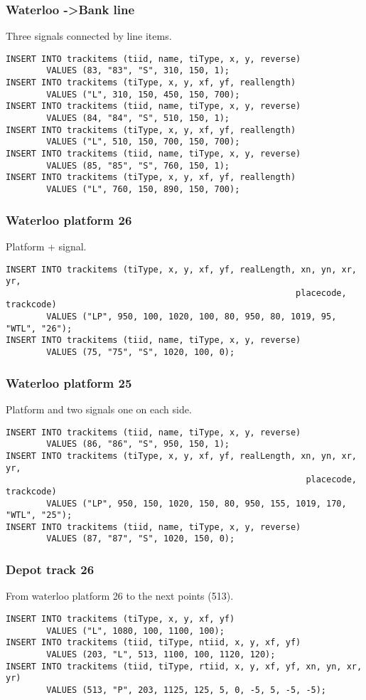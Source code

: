 \documentclass[12pt,a4paper]{article}
\begin{document}
\subsubsection{Waterloo -\textgreater Bank line}
Three signals connected by line items.
\begin{verbatim}
INSERT INTO trackitems (tiid, name, tiType, x, y, reverse)
        VALUES (83, "83", "S", 310, 150, 1);
INSERT INTO trackitems (tiType, x, y, xf, yf, reallength)
        VALUES ("L", 310, 150, 450, 150, 700);
INSERT INTO trackitems (tiid, name, tiType, x, y, reverse)
        VALUES (84, "84", "S", 510, 150, 1);
INSERT INTO trackitems (tiType, x, y, xf, yf, reallength)
        VALUES ("L", 510, 150, 700, 150, 700);
INSERT INTO trackitems (tiid, name, tiType, x, y, reverse)
        VALUES (85, "85", "S", 760, 150, 1);
INSERT INTO trackitems (tiType, x, y, xf, yf, reallength)
        VALUES ("L", 760, 150, 890, 150, 700);
\end{verbatim}

\subsubsection{Waterloo platform 26}
Platform + signal.
\begin{verbatim}
INSERT INTO trackitems (tiType, x, y, xf, yf, realLength, xn, yn, xr, yr,
                                                         placecode, trackcode)
        VALUES ("LP", 950, 100, 1020, 100, 80, 950, 80, 1019, 95, "WTL", "26");
INSERT INTO trackitems (tiid, name, tiType, x, y, reverse)
        VALUES (75, "75", "S", 1020, 100, 0);
\end{verbatim}

\subsubsection{Waterloo platform 25}
Platform and two signals one on each side.
\begin{verbatim}
INSERT INTO trackitems (tiid, name, tiType, x, y, reverse)
        VALUES (86, "86", "S", 950, 150, 1);
INSERT INTO trackitems (tiType, x, y, xf, yf, realLength, xn, yn, xr, yr, 
                                                           placecode, trackcode)
        VALUES ("LP", 950, 150, 1020, 150, 80, 950, 155, 1019, 170, "WTL", "25");
INSERT INTO trackitems (tiid, name, tiType, x, y, reverse)
        VALUES (87, "87", "S", 1020, 150, 0);
\end{verbatim}

\subsubsection{Depot track 26}
From waterloo platform 26 to the next points (513).
\begin{verbatim}
INSERT INTO trackitems (tiType, x, y, xf, yf)
        VALUES ("L", 1080, 100, 1100, 100);
INSERT INTO trackitems (tiid, tiType, ntiid, x, y, xf, yf)
        VALUES (203, "L", 513, 1100, 100, 1120, 120);
INSERT INTO trackitems (tiid, tiType, rtiid, x, y, xf, yf, xn, yn, xr, yr) 
        VALUES (513, "P", 203, 1125, 125, 5, 0, -5, 5, -5, -5);
\end{verbatim}
\end{document}
